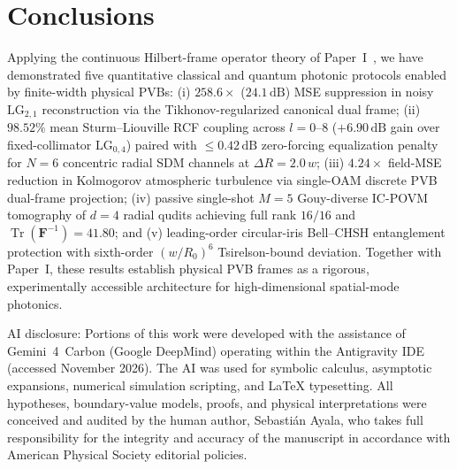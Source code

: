 \documentclass[aps,pra,reprint,nofootinbib,floatfix,longbibliography]{revtex4-2}
\begin{document}
\section{Conclusions}
\label{sec:conclusions}

Applying the continuous Hilbert-frame operator theory of Paper~I~\cite{AyalaPaperI}, we have demonstrated five quantitative classical and quantum photonic protocols enabled by finite-width physical PVBs: (i) $258.6\times$ ($24.1\,\mathrm{dB}$) MSE suppression in noisy $\mathrm{LG}_{2,1}$ reconstruction via the Tikhonov-regularized canonical dual frame; (ii) $98.52\%$ mean Sturm--Liouville RCF coupling across $l = 0\text{--}8$ ($+6.90\,\mathrm{dB}$ gain over fixed-collimator $\mathrm{LG}_{0,4}$) paired with $\le 0.42\,\mathrm{dB}$ zero-forcing equalization penalty for $N = 6$ concentric radial SDM channels at $\Delta R = 2.0\,w$; (iii) $4.24\times$ field-MSE reduction in Kolmogorov atmospheric turbulence via single-OAM discrete PVB dual-frame projection; (iv) passive single-shot $M = 5$ Gouy-diverse IC-POVM tomography of $d = 4$ radial qudits achieving full rank $16/16$ and $\operatorname{Tr}(\mathbf{F}^{-1}) = 41.80$; and (v) leading-order circular-iris Bell--CHSH entanglement protection with sixth-order $(w/R_0)^6$ Tsirelson-bound deviation. Together with Paper~I, these results establish physical PVB frames as a rigorous, experimentally accessible architecture for high-dimensional spatial-mode photonics.

\begin{acknowledgments}
AI disclosure: Portions of this work were developed with the assistance of Gemini~4~Carbon (Google DeepMind) operating within the Antigravity IDE (accessed November 2026). The AI was used for symbolic calculus, asymptotic expansions, numerical simulation scripting, and \LaTeX{} typesetting. All hypotheses, boundary-value models, proofs, and physical interpretations were conceived and audited by the human author, Sebasti\'an Ayala, who takes full responsibility for the integrity and accuracy of the manuscript in accordance with American Physical Society editorial policies.
\end{acknowledgments}
\end{document}
